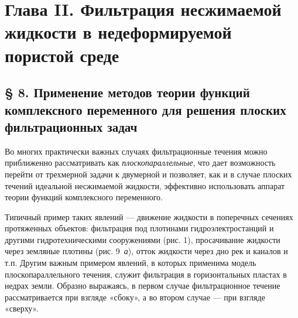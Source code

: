 \section*{Глава II. Фильтрация несжимаемой жидкости в недеформируемой пористой среде}
\subsection*{§ 8. Применение методов теории функций комплексного переменного для решения плоских фильтрационных задач}
\label{q5:sec-8}
Во многих практически важных случаях фильтрационные течения можно приближенно рассматривать как \textit{плоскопараллельные}, что дает возможность перейти от трехмерной задачи к двумерной и позволяет, как и в случае плоских течений идеальной несжимаемой жидкости, эффективно использовать аппарат теории функций комплексного переменного.

Типичный пример таких явлений --- движение жидкости в поперечных сечениях протяженных объектов: фильтрация под плотинами гидроэлектростанций и другими гидротехническими сооружениями (рис. 1), просачивание жидкости через земляные плотины (рис. 9~\textit{а}), отток жидкости через дно рек и каналов и т.п. Другим важным примером явлений, в которых применима модель плоскопараллельного течения, служит фильтрация в горизонтальных пластах в недрах земли. Образно выражаясь, в первом случае фильтрационное течение рассматривается при взгляде «сбоку», а во втором случае --- при взгляде «сверху».

